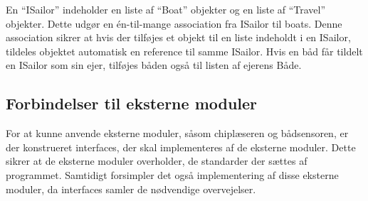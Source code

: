 En \enquote{ISailor} indeholder en liste af \enquote{Boat} objekter og en liste af \enquote{Travel} objekter. Dette udgør en én-til-mange association fra ISailor til boats. Denne association sikrer at hvis der tilføjes et objekt til en liste indeholdt i en ISailor, tildeles objektet automatisk en reference til samme ISailor. Hvis en båd får tildelt en ISailor som sin ejer, tilføjes båden også til listen af ejerens Både.

\subsection{Forbindelser til eksterne moduler}

For at kunne anvende eksterne moduler, såsom chiplæseren og bådsensoren, er der konstrueret interfaces, der skal implementeres af de eksterne moduler. Dette sikrer at de eksterne moduler overholder, de standarder der sættes af programmet. Samtidigt forsimpler det også implementering af disse eksterne moduler, da interfaces samler de nødvendige overvejelser.
